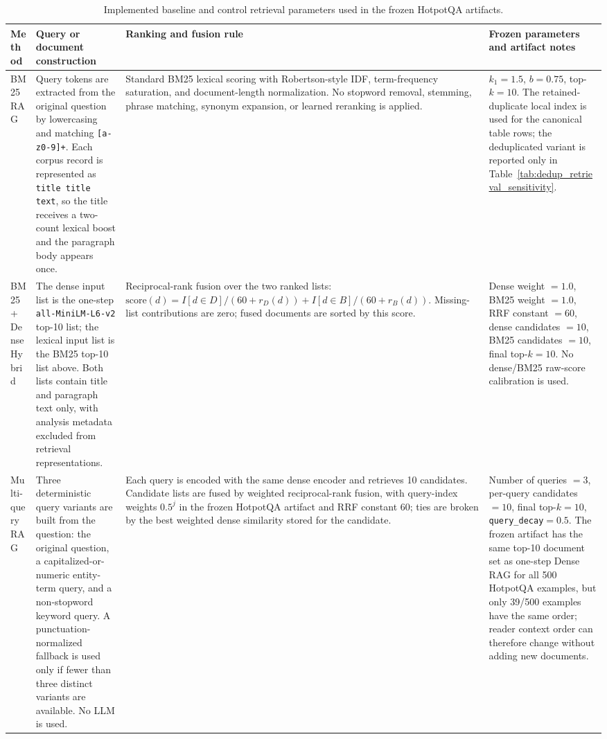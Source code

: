 \begin{table}[t]
\centering
\caption{Implemented baseline and control retrieval parameters used in the frozen HotpotQA artifacts.}
\label{tab:baseline_implementation_parameters}
\scriptsize
\begin{threeparttable}
\setlength{\tabcolsep}{3pt}
\begin{tabularx}{\textwidth}{>{\raggedright\arraybackslash}p{}
                            >{\raggedright\arraybackslash}p{}
                            >{\raggedright\arraybackslash}p{}
                            >{\raggedright\arraybackslash}X}
\toprule
Method & Query or document construction & Ranking and fusion rule & Frozen parameters and artifact notes \\
\midrule
BM25 RAG & Query tokens are extracted from the original question by lowercasing and matching \texttt{[a-z0-9]+}. Each corpus record is represented as \texttt{title title text}, so the title receives a two-count lexical boost and the paragraph body appears once. & Standard BM25 lexical scoring with Robertson-style IDF, term-frequency saturation, and document-length normalization. No stopword removal, stemming, phrase matching, synonym expansion, or learned reranking is applied. & $k_1=1.5$, $b=0.75$, top-$k=10$. The retained-duplicate local index is used for the canonical table rows; the deduplicated variant is reported only in Table~\ref{tab:dedup_retrieval_sensitivity}. \\
BM25 + Dense Hybrid & The dense input list is the one-step \texttt{all-MiniLM-L6-v2} top-10 list; the lexical input list is the BM25 top-10 list above. Both lists contain title and paragraph text only, with analysis metadata excluded from retrieval representations. & Reciprocal-rank fusion over the two ranked lists: $\mathrm{score}(d)=I[d\in D]/(60+r_D(d))+I[d\in B]/(60+r_B(d))$. Missing-list contributions are zero; fused documents are sorted by this score. & Dense weight $=1.0$, BM25 weight $=1.0$, RRF constant $=60$, dense candidates $=10$, BM25 candidates $=10$, final top-$k=10$. No dense/BM25 raw-score calibration is used. \\
Multi-query RAG & Three deterministic query variants are built from the question: the original question, a capitalized-or-numeric entity-term query, and a non-stopword keyword query. A punctuation-normalized fallback is used only if fewer than three distinct variants are available. No LLM is used. & Each query is encoded with the same dense encoder and retrieves 10 candidates. Candidate lists are fused by weighted reciprocal-rank fusion, with query-index weights $0.5^j$ in the frozen HotpotQA artifact and RRF constant $60$; ties are broken by the best weighted dense similarity stored for the candidate. & Number of queries $=3$, per-query candidates $=10$, final top-$k=10$, \texttt{query\_decay}$=0.5$. The frozen artifact has the same top-10 document set as one-step Dense RAG for all 500 HotpotQA examples, but only 39/500 examples have the same order; reader context order can therefore change without adding new documents. \\

\end{tabularx}
\end{threeparttable}
\end{table}
